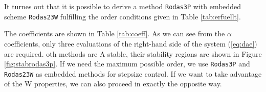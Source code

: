 \documentclass{juliacon}
\begin{document}
It turnes out that it is possible to derive a method \verb|Rodas3P| with embedded scheme \verb|Rodas23W| fulfilling the order conditions given in
Table \ref{tab:erfuellt}.

\begin{table} \label{tab:erfuellt}
\end{table}

The coefficients are shown in Table \ref{tab:coeff}.
As we can see from the $\alpha$ coefficients, only three evaluations of the right-hand side of the system (\ref{eq:dae}) are required.
oth methods are A stable, their stability regions are shown in Figure \ref{fig:stabrodas3p}.
If we need the maximum possible order, we use \verb|Rodas3P| and \verb|Rodas23W| as embedded methods for stepsize control. 
If we want to take advantage of the W properties, we can also proceed in exactly the opposite way.
\end{document}
